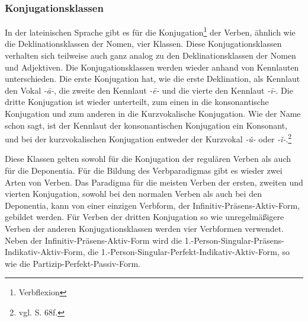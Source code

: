 \subsubsection{Konjugationsklassen}
In der lateinischen Sprache gibt es für die Konjugation\footnote{Verbflexion} der Verben, ähnlich wie die Deklinationsklassen der Nomen, vier Klassen. Diese Konjugationsklassen verhalten sich teilweise auch ganz analog zu den Deklinationsklassen der Nomen und Adjektiven. Die Konjugationsklassen werden wieder anhand von Kennlauten unterschieden. Die erste Konjugation hat, wie die erste Deklination, als Kennlaut den Vokal \textit{-ā-}, die zweite den Kennlaut \textit{-ē-} und die vierte den Kennlaut \textit{-ī-}. Die dritte Konjugation ist wieder unterteilt, zum einen in die konsonantische Konjugation und zum anderen in die Kurzvokalische Konjugation. Wie der Name schon sagt, ist der Kennlaut der konsonantischen Konjugation ein Konsonant, und bei der kurzvokalischen Konjugation entweder der Kurzvokal \textit{-ǔ-} oder \textit{-ǐ-}.\footnote{vgl. \cite{BAYER-LINDAUER1994} S. 68f.} \par
Diese Klassen gelten sowohl für die Konjugation der regulären Verben als auch für die Deponentia. Für die Bildung des Verbparadigmas gibt es wieder zwei Arten von Verben. Das Paradigma für die meisten Verben der ersten, zweiten und vierten Konjugation, sowohl bei den normalen Verben als auch bei den Deponentia, kann von einer einzigen Verbform, der Infinitiv-Präsens-Aktiv-Form, gebildet werden. Für Verben der dritten Konjugation so wie unregelmäßigere Verben der anderen Konjugationsklassen werden vier Verbformen verwendet. Neben der Infinitiv-Präsens-Aktiv-Form wird die 1.-Person-Singular-Präsens-Indikativ-Aktiv-Form, die 1.-Person-Singular-Perfekt-Indikativ-Aktiv-Form, so wie die Partizip-Perfekt-Passiv-Form.  \par
